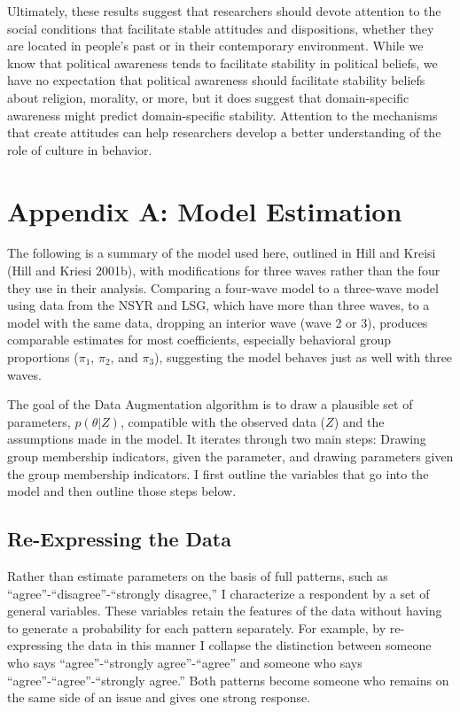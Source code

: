 \documentclass[12pt,]{article}
\begin{document}
Ultimately, these results suggest that researchers should devote attention to the social conditions that facilitate stable attitudes and dispositions, whether they are located in people's past or in their contemporary environment. While we know that political awareness tends to facilitate stability in political beliefs, we have no expectation that political awareness should facilitate stability beliefs about religion, morality, or more, but it does suggest that domain-specific awareness might predict domain-specific stability. Attention to the mechanisms that create attitudes can help researchers develop a better understanding of the role of culture in behavior.

\hypertarget{appendix-a-model-estimation}{%
\section{Appendix A: Model Estimation}\label{appendix-a-model-estimation}}

The following is a summary of the model used here, outlined in Hill and Kreisi (Hill and Kriesi 2001b), with modifications for three waves rather than the four they use in their analysis. Comparing a four-wave model to a three-wave model using data from the NSYR and LSG, which have more than three waves, to a model with the same data, dropping an interior wave (wave 2 or 3), produces comparable estimates for most coefficients, especially behavioral group proportions (\(\pi_1\), \(\pi_2\), and \(\pi_3\)), suggesting the model behaves just as well with three waves.

The goal of the Data Augmentation algorithm is to draw a plausible set of parameters, \(p(\theta|Z)\), compatible with the observed data (\(Z\)) and the assumptions made in the model. It iterates through two main steps: Drawing group membership indicators, given the parameter, and drawing parameters given the group membership indicators. I first outline the variables that go into the model and then outline those steps below.

\hypertarget{re-expressing-the-data}{%
\subsection{Re-Expressing the Data}\label{re-expressing-the-data}}

Rather than estimate parameters on the basis of full patterns, such as ``agree''-``disagree''-``strongly disagree,'' I characterize a respondent by a set of general variables. These variables retain the features of the data without having to generate a probability for each pattern separately. For example, by re-expressing the data in this manner I collapse the distinction between someone who says ``agree''-``strongly agree''-``agree'' and someone who says ``agree''-``agree''-``strongly agree.'' Both patterns become someone who remains on the same side of an issue and gives one strong response.
\end{document}
